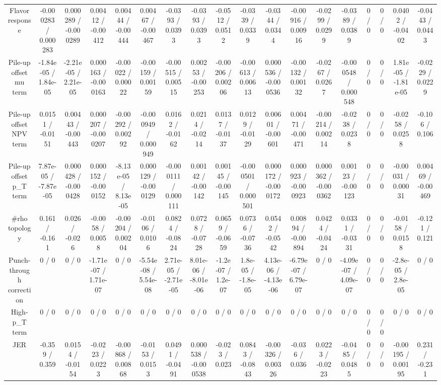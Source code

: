 \documentclass[10pt]{article}
\begin{document}
\begin{table}[htbp]
\begin{center}
\begin{tabular}{|c|c|c|c|c|c|c|c|c|c|c|c|c|c|c|c|c|c|}
  Flavor response & -0.000283 / 0.000283 & 0.000289 / -0.000289 & 0.00412 / -0.00412 & 0.00444 / -0.00444 & 0.00467 / -0.00467 & -0.0393 / 0.0393 & -0.0393 / 0.0393 & -0.0512 / 0.0512 & -0.0339 / 0.0339 & -0.0344 / 0.0344 & -0.00916 / 0.00916 & -0.0299 / 0.0299 & -0.0389 / 0.0389 & 0 / 0 & 0 / 0 & 0.0402 / -0.0402 & -0.0443 / 0.0443 \\ 
  Pile-up offset mu term & -1.84e-05 / 1.84e-05 & -2.21e-05 / 2.21e-05 & 0.000163 / -0.000163 & -0.00022 / 0.00022 & -0.00159 / 0.00159 & -0.00515 / 0.00515 & 0.00253 / -0.00253 & -0.00206 / 0.00206 & -0.00613 / 0.00613 & 0.000536 / -0.000536 & -0.00132 / 0.00132 & -0.0267 / 0.0267 & -0.000548 / 0.000548 & 0 / 0 & 0 / 0 & 1.81e-05 / -1.81e-05 & -0.0229 / 0.0229 \\ 
  Pile-up offset NPV term & 0.0151 / -0.0151 & 0.00443 / -0.00443 & 0.000207 / -0.000207 & -0.00292 / 0.00292 & -0.000949 / 0.000949 & 0.0162 / -0.0162 & 0.0214 / -0.0214 & 0.0137 / -0.0137 & 0.0129 / -0.0129 & 0.00601 / -0.00601 & 0.00471 / -0.00471 & -0.00214 / 0.00214 & -0.0238 / 0.0238 & 0 / 0 & 0 / 0 & -0.0258 / 0.0258 & -0.106 / 0.106 \\ 
  Pile-up offset p_{T} term & 7.87e-05 / -7.87e-05 & 0.000428 / -0.000428 & 0.000152 / -0.000152 & -8.13e-05 / 8.13e-05 & 0.000129 / -0.000129 & -0.000111 / 0.000111 & 0.00142 / -0.00142 & 0.00145 / -0.00145 & -0.000501 / 0.000501 & 0.000172 / -0.000172 & 0.000923 / -0.000923 & 0.000362 / -0.000362 & 0.00123 / -0.00123 & 0 / 0 & 0 / 0 & -0.00031 / 0.00031 & 0.00469 / -0.00469 \\ 
  #rho topology & 0.161 / -0.161 & 0.026 / -0.026 & -0.0058 / 0.0058 & -0.00204 / 0.00204 & -0.0106 / 0.0106 & 0.0824 / -0.0824 & 0.0728 / -0.0728 & 0.0659 / -0.0659 & 0.0736 / -0.0736 & 0.0542 / -0.0542 & 0.00894 / -0.00894 & 0.0424 / -0.0424 & 0.0331 / -0.0331 & 0 / 0 & 0 / 0 & -0.0158 / 0.0158 & -0.121 / 0.121 \\ 
  Punch-through correction & 0 / 0 & 0 / 0 & -1.71e-07 / 1.71e-07 & 0 / 0 & -5.54e-08 / 5.54e-08 & 2.71e-05 / -2.71e-05 & 8.01e-06 / -8.01e-06 & -1.2e-07 / 1.2e-07 & 1.8e-05 / -1.8e-05 & 4.13e-06 / -4.13e-06 & -6.79e-07 / 6.79e-07 & 0 / 0 & -4.09e-07 / 4.09e-07 & 0 / 0 & 0 / 0 & -2.8e-05 / 2.8e-05 & 0 / 0 \\ 
  High-p_{T} term & 0 / 0 & 0 / 0 & 0 / 0 & 0 / 0 & 0 / 0 & 0 / 0 & 0 / 0 & 0 / 0 & 0 / 0 & 0 / 0 & 0 / 0 & 0 / 0 & 0 / 0 & 0 / 0 & 0 / 0 & 0 / 0 & 0 / 0 \\ 
  JER & -0.359 / 0.359 & 0.0154 / -0.0154 & -0.0223 / 0.0223 & -0.00868 / 0.00868 & -0.0153 / 0.0153 & 0.0491 / -0.0491 & 0.000538 / -0.000538 & -0.023 / 0.023 & 0.0843 / -0.0843 & -0.00326 / 0.00326 & -0.036 / 0.036 & 0.0223 / -0.0223 & -0.0485 / 0.0485 & 0 / 0 & 0 / 0 & -0.00195 / 0.00195 & 0.231 / -0.231 \\ 

\end{tabular}
\end{center}
\end{table}
\end{document}
